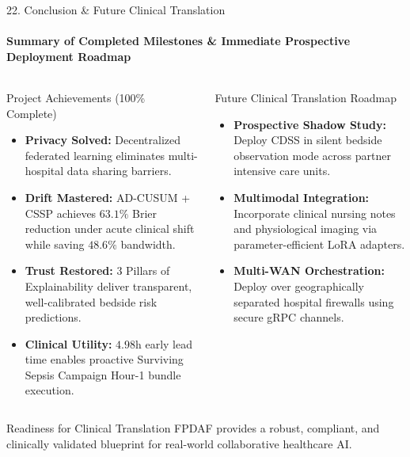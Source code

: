 \documentclass[aspectratio=169, 10pt]{beamer}
\begin{document}
\begin{frame}{22. Conclusion \& Future Clinical Translation}
    \framesubtitle{Summary of Completed Milestones \& Immediate Prospective Deployment Roadmap}
    \begin{columns}[T]
        \begin{block}{Project Achievements (100\% Complete)}
            \scriptsize
            \begin{itemize}
                \item \textbf{Privacy Solved:} Decentralized federated learning eliminates multi-hospital data sharing barriers.
                \item \textbf{Drift Mastered:} AD-CUSUM + CSSP achieves $\mathbf{63.1\%}$ Brier reduction under acute clinical shift while saving $\mathbf{48.6\%}$ bandwidth.
                \item \textbf{Trust Restored:} 3 Pillars of Explainability deliver transparent, well-calibrated bedside risk predictions.
                \item \textbf{Clinical Utility:} $4.98\text{h}$ early lead time enables proactive Surviving Sepsis Campaign Hour-1 bundle execution.
            \end{itemize}
        \end{block}

        \begin{block}{Future Clinical Translation Roadmap}
            \scriptsize
            \begin{itemize}
                \item \textbf{Prospective Shadow Study:} Deploy CDSS in silent bedside observation mode across partner intensive care units.
                \item \textbf{Multimodal Integration:} Incorporate clinical nursing notes and physiological imaging via parameter-efficient LoRA adapters.
                \item \textbf{Multi-WAN Orchestration:} Deploy over geographically separated hospital firewalls using secure gRPC channels.
            \end{itemize}
        \end{block}
    \end{columns}
    \vspace{0.15cm}
    \begin{alertblock}{\scriptsize Readiness for Clinical Translation}
        \scriptsize
        FPDAF provides a robust, compliant, and clinically validated blueprint for real-world collaborative healthcare AI.
    \end{alertblock}
\end{frame}
\end{document}
